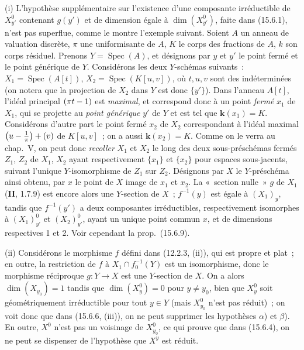\begin{remarks}[15.6.10]
(i) L'hypothèse supplémentaire sur l'existence d'une composante irréductible de $X_{y'}^0$ contenant $g(y')$ et de dimension égale à $\dim(X_{y'}^0)$, faite dans (15.6.1), n'est pas superflue, comme le montre l'exemple suivant. Soient $A$ un anneau de valuation discrète, $\pi$ une uniformisante de $A$, $K$ le corps des fractions de $A$, $k$ son corps résiduel. Prenons $Y=\operatorname{Spec}(A)$, et désignons par $y$ et $y'$ le point fermé et le point générique de $Y$. Considérons les deux $Y$-schémas suivants~: $X_1=\operatorname{Spec}(A[t])$, $X_2=\operatorname{Spec}(K[u,v])$, où $t,u,v$ sont des indéterminées (on notera que la projection de $X_2$ dans $Y$ est donc $\{y'\}$). Dans l'anneau $A[t]$, l'idéal principal $(\pi t- 1)$ est \emph{maximal}, et correspond donc à un point \emph{fermé} $x_1$ de $X_1$, qui se projette au \emph{point générique} $y'$ de $Y$ et est tel que $\boldsymbol{k}(x_1)=K$.
Considérons d'autre part le point fermé $x_2$ de $X_2$ correspondant à l'idéal maximal $\left(u-\frac{1}{\pi}\right)+(v)$ de $K[u,v]$~; on a aussi $\boldsymbol{k}(x_2)=K$. Comme on le verra au chap.~V, on peut donc \emph{recoller} $X_1$ et $X_2$ le long des deux sous-préschémas fermés $Z_1$, $Z_2$ de $X_1$, $X_2$ ayant respectivement $\{x_1\}$ et $\{x_2\}$ pour espaces sous-jacents, suivant l'unique $Y$-isomorphisme de $Z_1$ sur $Z_2$. Désignons par $X$ le $Y$-préschéma ainsi obtenu, par $x$ le point de $X$ image de $x_1$ et $x_2$. La «~section nulle~» $g$ de $X_1$ (\textbf{II}, 1.7.9) est encore alors une $Y$-section de $X$~; $f^{-1}(y)$ est égale à $(X_1)_y$, tandis que $f^{-1}(y')$ a deux composantes irréductibles, respectivement isomorphes à $(X_1)_{y'}^0$ et $(X_2)_{y'}^0$, ayant un unique point commun $x$, et de dimensions respectives 1 et 2. Voir cependant la prop.~(15.6.9).

(ii) Considérons le morphisme $f$ défini dans (12.2.3, (ii)), qui est propre et plat~; en outre, la restriction de $f$ à $X_1\cap f_0^{-1}(Y)$ est un isomorphisme, donc le morphisme réciproque $g:Y\to X$ est une $Y$-section de $X$. On a alors $\dim(X_{y_0})=1$ tandis que $\dim(X_y^0)=0$ pour $y\ne y_0$, bien que $X_y^0$ soit géométriquement irréductible pour tout $y\in Y$ (mais $X_{y_0}^0$ n'est pas réduit)~; on voit donc que dans (15.6.6, (iii)), on ne peut supprimer les hypothèses $\alpha$) et $\beta$). En outre, $X^0$ n'est pas un voisinage de $X_{y_0}^{0}$, ce qui prouve que dans (15.6.4), on ne peut se dispenser de l'hypothèse que $X^y$ est réduit.


\end{remarks}
